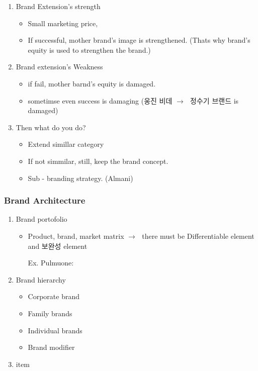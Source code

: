 \documentclass[12pt]{article}
\newcommand{\ra}{$\rightarrow \text{ }$}
\begin{document}
\begin{itemize}
\begin{enumerate}
	\item Brand Extension's strength
	\begin{itemize}
		\item Small marketing price,
		\item If successful, mother brand's image is strengthened. (Thats why brand's equity is used to strengthen the brand.)
	\end{itemize}
	\item Brand extension's Weakness
	\begin{itemize}
		\item if fail, mother barnd's equity is damaged.
		\item sometimse even success is damaging (웅진 비데 \ra 정수기 브랜드 is damaged)
	\end{itemize}
	\item Then what do you do?
	\begin{itemize}
		\item Extend simillar category
		\item If not simmilar, still, keep the brand concept.
		\item Sub - branding strategy. (Almani)
	\end{itemize}

\end{enumerate}

\subsubsection{Brand Architecture}

\begin{enumerate}
	\item Brand portofolio
	\begin{itemize}
		\item Product, brand, market matrix \ra there must be Differentiable element and 보완성 element

		Ex. Pulmuone:

	\end{itemize}
	\item Brand hierarchy
	\begin{itemize}
		\item Corporate brand
		\item Family brands
		\item Individual brands
		\item Brand modifier
	\end{itemize}
	\item item
\end{enumerate}




\end{itemize}
\end{document}
